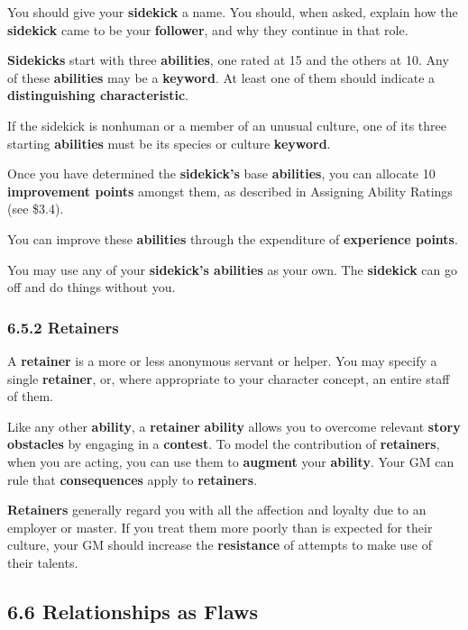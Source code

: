 \documentclass[
  11pt,
]{article}
\begin{document}
You should give your \textbf{sidekick} a name. You should, when asked,
explain how the \textbf{sidekick} came to be your \textbf{follower}, and
why they continue in that role.

\textbf{Sidekicks} start with three \textbf{abilities}, one rated at 15
and the others at 10. Any of these \textbf{abilities} may be a
\textbf{keyword}. At least one of them should indicate a
\textbf{distinguishing characteristic}.

If the sidekick is nonhuman or a member of an unusual culture, one of
its three starting \textbf{abilities} must be its species or culture
\textbf{keyword}.

Once you have determined the \textbf{sidekick's} base
\textbf{abilities}, you can allocate 10 \textbf{improvement points}
amongst them, as described in Assigning Ability Ratings (see \$3.4).

You can improve these \textbf{abilities} through the expenditure of
\textbf{experience points}.

You may use any of your \textbf{sidekick's abilities} as your own. The
\textbf{sidekick} can go off and do things without you.

\hypertarget{retainers}{%
\subsubsection{6.5.2 Retainers}\label{retainers}}

A \textbf{retainer} is a more or less anonymous servant or helper. You
may specify a single \textbf{retainer}, or, where appropriate to your
character concept, an entire staff of them.

Like any other \textbf{ability}, a \textbf{retainer} \textbf{ability}
allows you to overcome relevant \textbf{story obstacles} by engaging in
a \textbf{contest}. To model the contribution of \textbf{retainers},
when you are acting, you can use them to \textbf{augment} your
\textbf{ability}. Your GM can rule that \textbf{consequences} apply to
\textbf{retainers}.

\textbf{Retainers} generally regard you with all the affection and
loyalty due to an employer or master. If you treat them more poorly than
is expected for their culture, your GM should increase the
\textbf{resistance} of attempts to make use of their talents.

\hypertarget{relationships-as-flaws}{%
\subsection{6.6 Relationships as Flaws}\label{relationships-as-flaws}}
\end{document}
